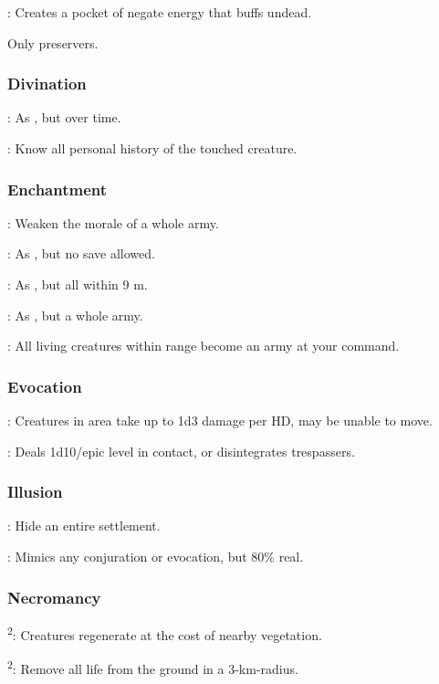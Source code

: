 : Creates a pocket of negate energy that buffs undead.

 Only preservers.


\subsubsection{Divination}
: As , but over time. %

: Know all personal history of the touched creature.


\subsubsection{Enchantment}
: Weaken the morale of a whole army.

: As , but no save allowed.

: As , but all within 9 m. %

: As , but a whole army.

: All living creatures within range become an army at your command.


\subsubsection{Evocation}
: Creatures in area take up to 1d3 damage per HD, may be unable to move.

: Deals 1d10/epic level in contact, or disintegrates trespassers.


\subsubsection{Illusion}
: Hide an entire settlement. %

: Mimics any conjuration or evocation, but 80\% real. %


\subsubsection{Necromancy}
\textsuperscript{2}: Creatures regenerate at the cost of nearby vegetation.

\textsuperscript{2}: Remove all life from the ground in a 3-km-radius. %

